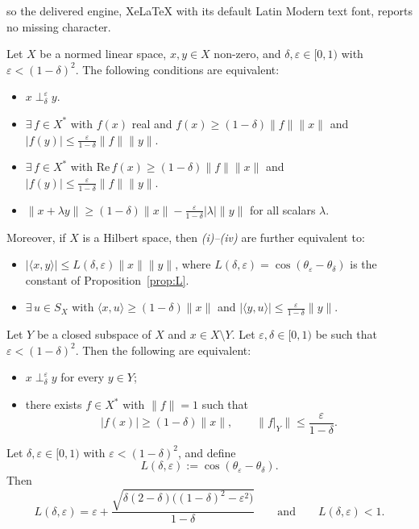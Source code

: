 \documentclass[10pt,a4paper]{amsart}
\newcommand{\nperp}{\perp_{\delta}^\varepsilon}
\begin{document}
so the delivered engine, XeLaTeX with its default Latin Modern text font, reports no missing character.
\begin{theorem}\label{Thm:Equiv}
Let $X$ be a normed linear space, $x, y \in X$ non-zero, and $\delta, \varepsilon 
\in [0,1)$ with $\varepsilon < (1-\delta)^2$. The following conditions are equivalent:
\begin{itemize}
    \item[(i)] $x \nperp y$.
    \item[(ii)] $\exists\, f \in X^*$ with $f(x)$ real and $f(x) \geq (1-\delta)\|f\|\|x\|$ 
    and $|f(y)| \leq \frac{\varepsilon}{1-\delta}\|f\|\|y\|$.
    \item[(iii)] $\exists\, f \in X^*$ with $\mathrm{Re}\,f(x) \geq (1-\delta)\|f\|\|x\|$ 
    and $|f(y)| \leq \frac{\varepsilon}{1-\delta}\|f\|\|y\|$.
    \item[(iv)] $\|x + \lambda y\| \geq (1-\delta)\|x\| - 
    \frac{\varepsilon}{1-\delta}|\lambda|\|y\|$ for all scalars $\lambda$.
\end{itemize}
Moreover, if $X$ is a Hilbert space, then \emph{(i)--(iv)} are further equivalent to:
\begin{itemize}
    \item[(v)] $|\langle x, y\rangle| \leq L(\delta,\varepsilon)\|x\|\|y\|$, where
$L(\delta,\varepsilon)=\cos(\theta_\varepsilon-\theta_\delta)$ is the constant of Proposition~\ref{prop:L}.
   \item[(vi)] $\exists\, u \in S_X$ with $\langle x, u\rangle \geq (1-\delta)\|x\|$ 
    and $|\langle y, u\rangle| \leq \frac{\varepsilon}{1-\delta}\|y\|$.
\end{itemize}
\end{theorem}

\begin{theorem}\label{thm:subspace}
Let $Y$ be a closed subspace of $X$ and $x \in X \setminus Y$. Let $\varepsilon, \delta \in [0,1)$ be such that $\varepsilon < (1-\delta)^2$. Then 
the following are equivalent:
\begin{itemize}
    \item[(a)] $x \nperp y$ 
for every $y \in Y$;
    \item[(b)]  there exists $f \in X^*$ with $\|f\| = 1$ such that
\[
|f(x)| \geq (1-\delta)\|x\|, \qquad \|f|_Y\| \leq \frac{\varepsilon}{1-\delta}.
\]
\end{itemize}
\end{theorem}

\begin{proposition}\label{prop:L}
Let $\delta,\varepsilon \in [0,1)$ with $\varepsilon < (1-\delta)^2$, and define
\[
L(\delta,\varepsilon) := \cos(\theta_\varepsilon-\theta_\delta).
\]
Then
\[
L(\delta,\varepsilon) = \varepsilon +
\frac{\sqrt{\delta(2-\delta)\bigl((1-\delta)^2-\varepsilon^2\bigr)}}{1-\delta}
\qquad\text{and}\qquad L(\delta,\varepsilon)<1 .
\]
\end{proposition}
\end{document}
